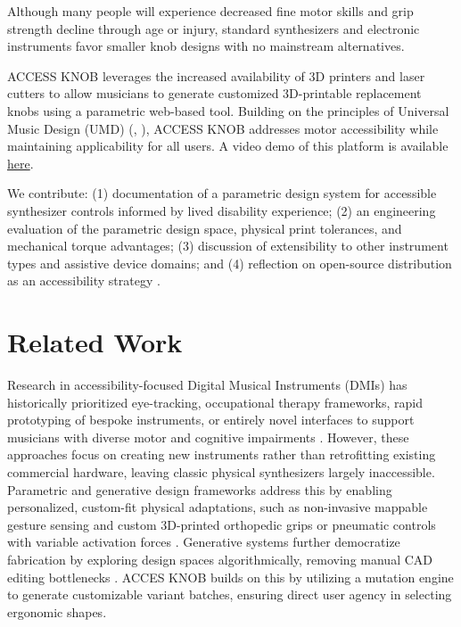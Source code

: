 \documentclass[manuscript,screen,review,anonymous]{acmart}
\begin{document}
Although many people will experience decreased fine motor skills and grip strength decline through age or injury, standard synthesizers and electronic instruments favor smaller knob designs with no mainstream alternatives. \cite{larsen2016prospects}

ACCESS KNOB leverages the increased availability of 3D printers and laser cutters \cite{nime2026_92}
to allow musicians to generate customized 3D-printable replacement knobs using a parametric web-based tool. Building on the principles of Universal Music Design (UMD) (\cite{hergert2024gestolumina}, \cite{cavdir2025sonic}), ACCESS KNOB addresses motor accessibility while maintaining applicability for all users. A video demo of this platform is available \href{https://www.youtube.com/watch?v=cEG93wy7U9o}{here}.

We contribute: (1) documentation of a parametric design system for accessible synthesizer controls informed by lived disability experience; (2) an engineering evaluation of the parametric design space, physical print tolerances, and mechanical torque advantages; (3) discussion of extensibility to other instrument types and assistive device domains; and (4) reflection on open-source distribution as an accessibility strategy \cite{strail2014_nime}.

\section{Related Work} %

Research in accessibility-focused Digital Musical Instruments (DMIs) has historically prioritized eye-tracking, occupational therapy frameworks, rapid prototyping of bespoke instruments, or entirely novel interfaces to support musicians with diverse motor and cognitive impairments \cite{frid2019accessible, mcmillan2023designing, mccloskey2015accessibility, payne2020eye, holland2020expanding}. However, these approaches focus on creating new instruments rather than retrofitting existing commercial hardware, leaving classic physical synthesizers largely inaccessible. Parametric and generative design frameworks address this by enabling personalized, custom-fit physical adaptations, such as non-invasive mappable gesture sensing \cite{strail2012nime} and custom 3D-printed orthopedic grips or pneumatic controls with variable activation forces \cite{tandon2023parametric, santos2023parametric, desai20153dprinting}. Generative systems further democratize fabrication by exploring design spaces algorithmically, removing manual CAD editing bottlenecks \cite{hofmann2020living}. ACCES KNOB builds on this by utilizing a mutation engine to generate customizable variant batches, ensuring direct user agency in selecting ergonomic shapes.
\end{document}
